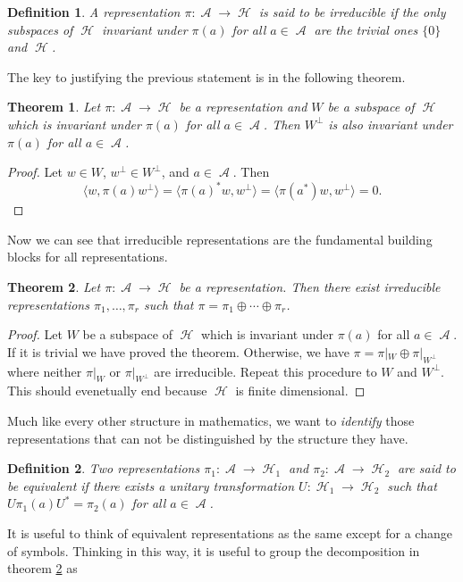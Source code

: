 \documentclass{article}
\newtheorem{definition}{Definition}
\newtheorem{theorem}{Theorem}
\DeclareMathOperator{\A}{\mathcal{A}}
\DeclareMathOperator{\Hil}{\mathcal{H}}
\begin{document}
\begin{definition}
A representation $\pi:\A\rightarrow\Hil$ is said to be irreducible if the only subspaces of $\Hil$ invariant under $\pi(a)$ for all $a\in\A$ are the trivial ones $\{0\}$ and $\Hil$.
\end{definition}

The key to justifying the previous statement is in the following theorem. 

\begin{theorem}
Let $\pi:\A\rightarrow\Hil$ be a representation and $W$ be a subspace of $\Hil$ which is invariant under $\pi(a)$ for all $a\in\A$. Then $W^\bot$ is also invariant under $\pi(a)$ for all $a\in\A$.
\end{theorem}
\begin{proof}
Let $w\in W$, $w^\bot\in W^\bot$, and $a\in\A$. Then
\begin{equation}
\langle w,\pi(a)w^\bot\rangle=\langle\pi(a)^*w,w^\bot\rangle=\langle\pi(a^*)w,w^\bot\rangle=0.
\end{equation}
\end{proof}

Now we can see that irreducible representations are the fundamental building blocks for all representations.

\begin{theorem}\label{thm:complete reducibility}
Let $\pi:\A\rightarrow\Hil$ be a representation. Then there exist irreducible representations $\pi_1,\dots,\pi_r$ such that $\pi=\pi_1\oplus\cdots\oplus\pi_r$.
\end{theorem}
\begin{proof}
Let $W$ be a subspace of $\Hil$ which is invariant under $\pi(a)$ for all $a\in\A$. If it is trivial we have proved the theorem. Otherwise, we have $\pi=\pi|_W\oplus\pi|_{W^\bot}$ where neither $\pi|_W$ or $\pi|_{W^\bot}$ are irreducible. Repeat this procedure to $W$ and $W^\bot$. This should evenetually end because $\Hil$ is finite dimensional. 
\end{proof}

Much like every other structure in mathematics, we want to \textit{identify} those representations that can not be distinguished by the structure they have.

\begin{definition}
Two representations $\pi_1:\A\rightarrow\Hil_1$ and $\pi_2:\A\rightarrow\Hil_2$ are said to be equivalent if there exists a unitary transformation $U:\Hil_1\rightarrow\Hil_2$ such that $U\pi_1(a)U^*=\pi_2(a)$ for all $a\in\A$. 
\end{definition}

It is useful to think of equivalent representations as the same except for a change of symbols. Thinking in this way, it is useful to group the decomposition in theorem \ref{thm:complete reducibility} as 



\end{document}
